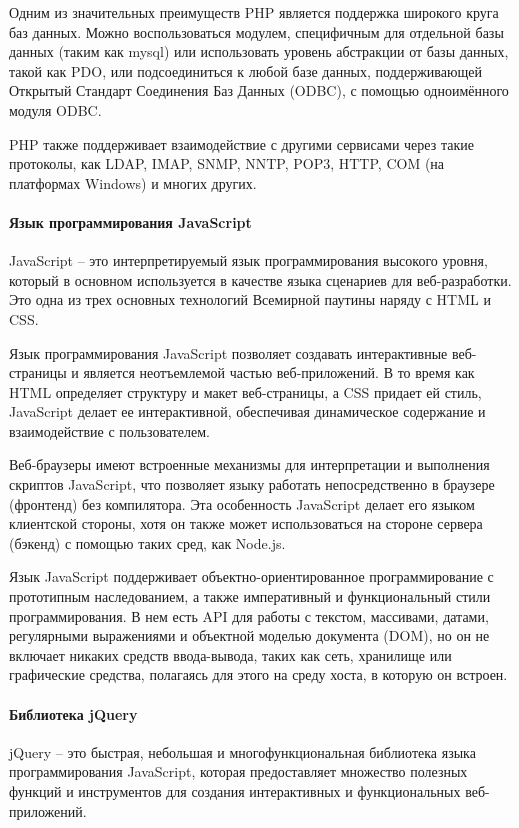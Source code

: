 Одним из значительных преимуществ PHP является поддержка широкого круга баз данных. Можно воспользоваться модулем, специфичным для отдельной базы данных (таким как mysql) или использовать уровень абстракции от базы данных, такой как PDO, или подсоединиться к любой базе данных, поддерживающей Открытый Стандарт Соединения Баз Данных (ODBC), с помощью одноимённого модуля ODBC.

PHP также поддерживает взаимодействие с другими сервисами через такие протоколы, как LDAP, IMAP, SNMP, NNTP, POP3, HTTP, COM (на платформах Windows) и многих других.

\paragraph{Язык программирования JavaScript}
JavaScript -- это интерпретируемый язык программирования высокого уровня, который в основном используется в качестве языка сценариев для веб-разработки. Это одна из трех основных технологий Всемирной паутины наряду с HTML и CSS.

Язык программирования JavaScript позволяет создавать интерактивные веб-страницы и является неотъемлемой частью веб-приложений. В то время как HTML определяет структуру и макет веб-страницы, а CSS придает ей стиль, JavaScript делает ее интерактивной, обеспечивая динамическое содержание и взаимодействие с пользователем.

Веб-браузеры имеют встроенные механизмы для интерпретации и выполнения скриптов JavaScript, что позволяет языку работать непосредственно в браузере (фронтенд) без компилятора. Эта особенность JavaScript делает его языком клиентской стороны, хотя он также может использоваться на стороне сервера (бэкенд) с помощью таких сред, как Node.js.

Язык JavaScript поддерживает объектно-ориентированное программирование с прототипным наследованием, а также императивный и функциональный стили программирования. В нем есть API для работы с текстом, массивами, датами, регулярными выражениями и объектной моделью документа (DOM), но он не включает никаких средств ввода-вывода, таких как сеть, хранилище или графические средства, полагаясь для этого на среду хоста, в которую он встроен.

\paragraph{Библиотека jQuery}
jQuery -- это быстрая, небольшая и многофункциональная библиотека языка программирования JavaScript, которая предоставляет множество полезных функций и инструментов для создания интерактивных и функциональных веб-приложений.

